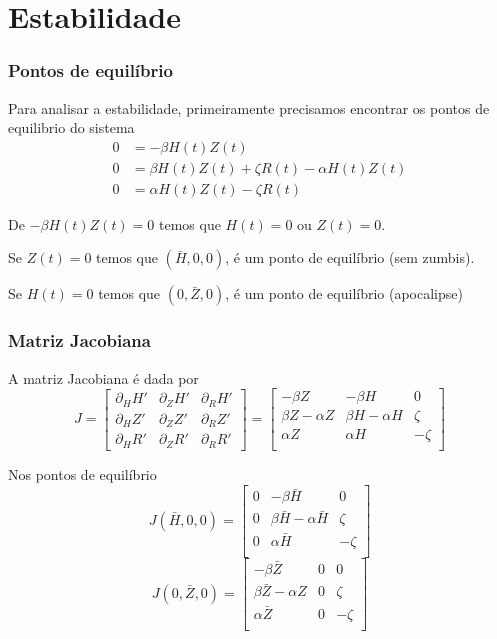 \documentclass[xcolor=dvipsnames, aspectratio=169]{beamer}
\begin{document}
    \section{Estabilidade}
    \begin{frame}
        \frametitle{Pontos de equilíbrio}
        Para analisar a estabilidade, primeiramente precisamos encontrar os pontos de equilibrio do sistema
        \begin{align*}
            0 &= -\beta H(t) Z(t)\\
            0 &= \beta H(t) Z(t) + \zeta R(t) - \alpha H(t) Z(t)\\
            0 &= \alpha H(t) Z(t) - \zeta R(t)
        \end{align*}
    \end{frame}
    \begin{frame}
        De $-\beta H(t) Z(t) = 0$ temos que $H(t) = 0$ ou $Z(t) = 0$.

        Se $Z(t) = 0$ temos que $(\bar H, 0, 0)$, é um ponto de equilíbrio (sem zumbis).

        Se $H(t) = 0$ temos que $(0, \bar Z, 0)$, é um ponto de equilíbrio (apocalipse)
    \end{frame}
    \begin{frame}
        \frametitle{Matriz Jacobiana}
        A matriz Jacobiana é dada por
        \[
            J = 
            \begin{bmatrix}
                \partial_H H' & \partial_Z H' & \partial_R H'\\
                \partial_H Z' & \partial_Z Z' & \partial_R Z'\\
                \partial_H R' & \partial_Z R' & \partial_R R'
            \end{bmatrix}
            =
            \begin{bmatrix}
                -\beta Z & -\beta H & 0\\
                \beta Z - \alpha Z & \beta H - \alpha H & \zeta\\
                \alpha Z & \alpha H & -\zeta\\
            \end{bmatrix}
        \]
    \end{frame}
    \begin{frame}
        Nos pontos de equilíbrio
        \[
            J(\bar H, 0, 0) =
            \begin{bmatrix}
                0 & -\beta \bar H & 0\\
                0 & \beta \bar H - \alpha \bar H & \zeta\\
                0 & \alpha \bar H & -\zeta\\
            \end{bmatrix}
        \]
        \[
            J(0, \bar Z, 0) =
            \begin{bmatrix}
                -\beta \bar Z & 0 & 0\\
                \beta \bar Z - \alpha Z & 0 & \zeta\\
                \alpha \bar Z & 0 & -\zeta\\
            \end{bmatrix}
        \]
    \end{frame}
\end{document}

